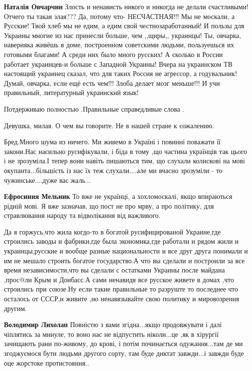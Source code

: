 \begin{itemize}
\textbf{Наталія Овчарчин} Злость и ненависть никого и никогда не делали
счастливыми! Отчего ты такая злая??? Да, потому что- НЕСЧАСТНАЯ!!! Мы не
москали, а Русские! Твой хлеб мы не едим, а едим свой честнозаработанный! И
пользы для Украины многие из нас принесли больше, чем ,,щиры,, украинцы! Ты,
овчарка, наверняка живёшь в доме, построенном советскими людьми, пользуешься их
готовыми благами! А среди них было много русских! А сколько в России работает
украинцев-и больше с Западной Украины! Вчера на украинском ТВ настоящий
украинец сказал, что для таких Россия не агрессор, а годувальник! Думай,
овчарка, если ещё есть чем!!! Злоба делает мозг меньше!!! И учи правильный,
литературный украинский язык!
\end{itemize}


Потдерживаю полностью .Правильные справедливые слова .


Девушка, милая. О чем вы говорите. Не в нашей стране к сожалению.


Бред.Много шума из ничего. Ми живемо в Україні і повинні поважати її закони.Нас
насильно русифікували, і біда в тому ,що частина українців так цього і не
зрозуміла.І тепер вони навіть пишаються тим, що слухали колискові на мові
окупанта...більшість із нас їх теж слухали....але ми вчасно зрозуміли - то
чужинське....дуже вас жаль...

\begin{itemize}

\textbf{Ефросиния Мельник} То вже не українці, а хохломоскалі, якщо впираються рідній мові.
Я вже зазначав, що пост не про мрву, а про політику, для стравлювання народу та
відволікання від важливого.


Да я горжусь,что жила когдо-то в богатой русифицированой Украине,где строились заводы и фабрики,где была экономика,где работали и рядом жили и украинцы,русские и вообще разные национальности и все друг друга понимали и им не мешало строить богатое государство.А что вы сделали и построили за все время независимости,что вы сделали с остатками Украины после майдана ,прос@ли Крым и Донбасс.А сами ненавидя все русское живете в домах ,что строились при союзе.Ну если такие правильные то разруште то последнее что осталось от СССР,и живите ,но ненавязывайте свою политику и мировозрения другим.

\textbf{Володимир Лихолап} Повністю з вами згідна...якщо продовжувати і далі
чіплятись за минуле, то воно нас не відпустить ніколи...це ,як в
хірургії зачищають рани по-живому, до крові, і потім починається
одужання...там де ми згоджуємося бути людьми другого сорту, там буде диктат
завжди...і завжди буде оце жорстоке протистояння..
\end{itemize}

